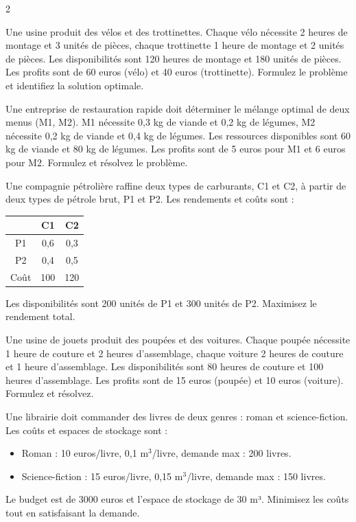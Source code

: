 \begin{multicols}{2}
\begin{exo}
	Une usine produit des vélos et des trottinettes. Chaque vélo nécessite 2 heures de montage et 3 unités de pièces, chaque trottinette 1 heure de montage et 2 unités de pièces. Les disponibilités sont 120 heures de montage et 180 unités de pièces. Les profits sont de 60 euros (vélo) et 40 euros (trottinette). Formulez le problème et identifiez la solution optimale.
\end{exo}

\begin{exo}
	Une entreprise de restauration rapide doit déterminer le mélange optimal de deux menus (M1, M2). M1 nécessite 0,3 kg de viande et 0,2 kg de légumes, M2 nécessite 0,2 kg de viande et 0,4 kg de légumes. Les ressources disponibles sont 60 kg de viande et 80 kg de légumes. Les profits sont de 5 euros pour M1 et 6 euros pour M2. Formulez et résolvez le problème.
\end{exo}

\begin{exo}
	Une compagnie pétrolière raffine deux types de carburants, C1 et C2, à partir de deux types de pétrole brut, P1 et P2. Les rendements et coûts sont :
	\begin{center}
		\begin{tabular}{c|cc}
			& C1 & C2 \\
			\hline
			P1 & 0,6 & 0,3 \\
			P2 & 0,4 & 0,5 \\
			Coût & 100 & 120 \\
		\end{tabular}
	\end{center}
	Les disponibilités sont 200 unités de P1 et 300 unités de P2. Maximisez le rendement total.
\end{exo}

\begin{exo}
	Une usine de jouets produit des poupées et des voitures. Chaque poupée nécessite 1 heure de couture et 2 heures d'assemblage, chaque voiture 2 heures de couture et 1 heure d'assemblage. Les disponibilités sont 80 heures de couture et 100 heures d'assemblage. Les profits sont de 15 euros (poupée) et 10 euros (voiture). Formulez et résolvez.
\end{exo}

\begin{exo}
	Une librairie doit commander des livres de deux genres : roman et science-fiction. Les coûts et espaces de stockage sont :
	\begin{itemize}
		\item Roman : 10 euros/livre, 0,1 m$^{3}$/livre, demande max : 200 livres.
		\item Science-fiction : 15 euros/livre, 0,15 m$^{3}$/livre, demande max : 150 livres.
	\end{itemize}
	Le budget est de 3000 euros et l'espace de stockage de 30 m³. Minimisez les coûts tout en satisfaisant la demande.
\end{exo}


\end{multicols}
